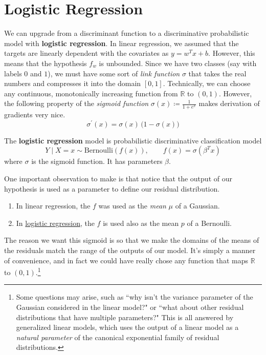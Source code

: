 \section{Logistic Regression} 

  We can upgrade from a discriminant function to a discriminative probabilistic model with \textbf{logistic regression}. In linear regression, we assumed that the targets are linearly dependent with the covariates as $y = w^T x + b$. However, this means that the hypothesis $f_w$ is unbounded. Since we have two classes (say with labels $0$ and $1$), we must have some sort of \textit{link function} $\sigma$ that takes the real numbers and compresses it into the domain $[0, 1]$. Technically, we can choose any continuous, monotonically increasing function from $\mathbb{R}$ to $(0, 1)$. However, the following property of the \textit{sigmoid function} $\sigma(x) \coloneqq \frac{1}{1 + e^{x}}$ makes derivation of gradients very nice. \begin{equation}
    \sigma^\prime (x) = \sigma(x) \, \big(1 - \sigma(x) \big)
  \end{equation}

  \begin{definition}
    \label{def:logistic-regression}
    The \textbf{logistic regression} model is probabilistic discriminative classification model  
    \begin{equation}
      Y \mid X = x \sim \mathrm{Bernoulli}(f(x)), \qquad f(x) = \sigma(\beta^T x)
    \end{equation}
    where $\sigma$ is the sigmoid function. It has parameters $\beta$. 
  \end{definition} 

  One important observation to make is that notice that the output of our hypothesis is used as a parameter to define our residual distribution. 
  \begin{enumerate}
    \item In linear regression, the $f$ was used as the \textit{mean} $\mu$ of a Gaussian. 
    \item In \hyperref[def:logistic-regression]{logistic regression}, the $f$ is used also as the mean $p$ of a Bernoulli. 
  \end{enumerate}
  The reason we want this sigmoid is so that we make the domains of the means of the residuals match the range of the outputs of our model. It's simply a manner of convenience, and in fact we could have really chose any function that maps $\mathbb{R}$ to $(0, 1)$.\footnote{Some questions may arise, such as ``why isn't the variance parameter of the Gaussian considered in the linear model?" or ``what about other residual distributions that have multiple parameters?" This is all answered by generalized linear models, which uses the output of a linear model as a \textit{natural parameter} of the canonical exponential family of residual distributions. }

